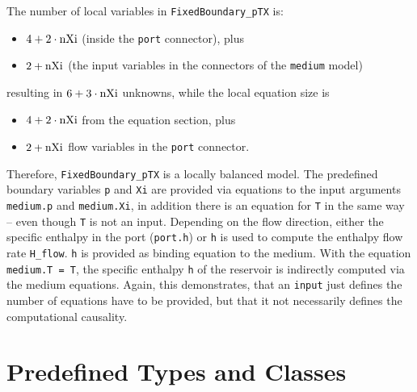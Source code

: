 \begin{example}
The number of local variables in \lstinline!FixedBoundary_pTX! is:
\begin{itemize}
\item
  $4 + 2 \cdot \text{\lstinline!nXi!}$ (inside the \lstinline!port! connector), plus
\item
  $2 + \text{\lstinline!nXi!}$ (the input variables in the connectors of the \lstinline!medium! model)
\end{itemize}
resulting in $6 + 3 \cdot \text{\lstinline!nXi!}$ unknowns, while the local equation size is
\begin{itemize}
\item
  $4 + 2 \cdot \text{\lstinline!nXi!}$ from the equation section, plus
\item
  $2 + \text{\lstinline!nXi!}$ flow variables in the \lstinline!port! connector.
\end{itemize}

Therefore, \lstinline!FixedBoundary_pTX! is a locally balanced model.
The predefined boundary variables \lstinline!p! and \lstinline!Xi! are provided via equations to the input arguments \lstinline!medium.p! and \lstinline!medium.Xi!, in addition there is an equation for \lstinline!T! in the same way -- even though \lstinline!T! is not an input.
Depending on the flow direction, either the specific enthalpy in the port (\lstinline!port.h!) or \lstinline!h! is used to compute the enthalpy flow rate \lstinline!H_flow!.
\lstinline!h! is provided as binding equation to the medium.
With the equation \lstinline!medium.T = T!, the specific enthalpy \lstinline!h! of the reservoir is indirectly computed via the medium equations.
Again, this demonstrates, that an \lstinline!input! just defines the number of equations have to be provided, but that it not necessarily defines the computational causality.
\end{example}

\section{Predefined Types and Classes}\label{predefined-types-and-classes}


